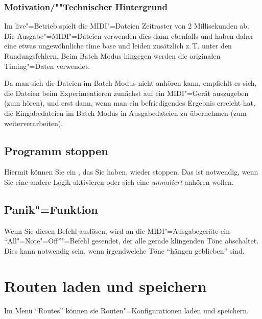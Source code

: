 \subsubsection{Motivation/""Technischer Hintergrund}


Im live"=Betrieb spielt \mutabor{} die MIDI"=Dateien Zeitraster 
von 2 Millisekunden ab. Die Ausgabe"=MIDI"=Dateien verwenden dies 
dann ebenfalls und haben daher eine etwas ungewöhnliche time 
base und leiden zusätzlich z.\,T. unter den Rundungsfehlern. 
Beim Batch Modus hingegen werden die originalen Timing"=Daten 
verwendet.


Da man sich die Dateien im Batch Modus nicht anhören kann, 
empfiehlt es sich, die Dateien beim Experimentieren zunächst 
auf ein MIDI"=Gerät auszugeben (zum hören), und erst dann, 
wenn man ein befriedigendes Ergebnis erreicht hat, die Eingabedateien 
im Batch Modus in Ausgabedateien zu übernehmen (zum weiterverarbeiten).



\subsection{Programm stoppen}\label{sec:MI_STOP}



Hiermit können Sie ein ,
das Sie  haben, wieder stoppen. Das 
ist notwendig, wenn Sie eine andere Logik aktivieren oder sich 
eine  \textit{unmutiert} anhören wollen.



\subsection{Panik"=Funktion}\label{sec:MI_PANIC}



Wenn Sie diesen Befehl auslösen, wird an die MIDI"=Ausgabegeräte 
ein ``All"=Note"=Off''"=Befehl gesendet, der alle gerade klingenden 
Töne abschaltet. Dies kann notwendig sein, wenn irgendwelche 
Töne ``hängen geblieben'' sind.




\section{Routen laden und speichern}\label{sec:MS_ROUTES}
Im Menü "`Routes"' können sie Routen"=Konfigurationen laden 
und speichern.

